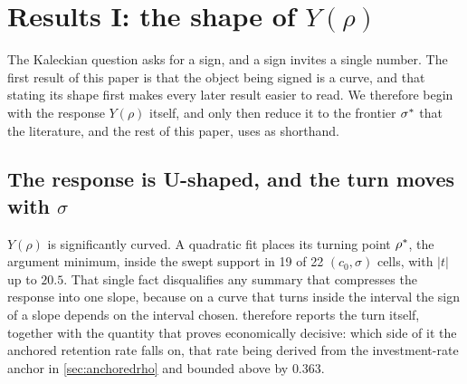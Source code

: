 
\section{Results I: the shape of \texorpdfstring{$Y(\rho)$}{Y(rho)}}
\label{sec:shape}

The Kaleckian question asks for a sign, and a sign invites a single number. The
first result of this paper is that the object being signed is a curve,
and that stating its shape first makes every later result easier to read. We
therefore begin with the response $Y(\rho)$ itself, and only then reduce it to
the frontier $\sigma^{\ast}$ that the literature, and the rest of this paper, 
uses as shorthand.

\subsection{The response is U-shaped, and the turn moves with
\texorpdfstring{$\sigma$}{sigma}}
\label{sec:turning}

$Y(\rho)$ is significantly curved. A quadratic fit places its turning point
$\rho^{\ast}$, the argument minimum, inside the swept support in 19
of 22 $(c_0,\sigma)$ cells, with $|t|$ up to $20.5$. That single fact
disqualifies any summary that compresses the response into one slope, because
on a curve that turns inside the interval the sign of a slope depends on the
interval chosen.  therefore reports the turn itself, together
with the quantity that proves economically decisive: which side of it
the anchored retention rate falls on, that rate being derived from the
investment-rate anchor in \cref{sec:anchoredrho} and bounded above by $0.363$.

